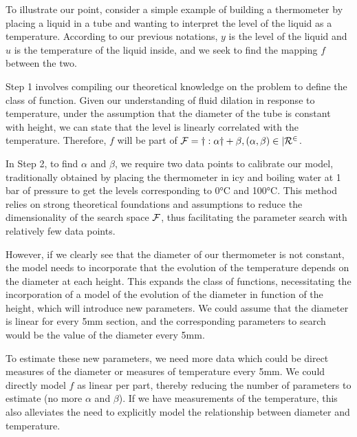 \begin{bibunit}
To illustrate our point, consider a simple example of building a thermometer by placing a liquid in a tube and wanting to interpret the level of the liquid as a temperature. According to our previous notations, $y$ is the level of the liquid and $u$ is the temperature of the liquid inside, and we seek to find the mapping $f$ between the two.

Step 1 involves compiling our theoretical knowledge on the problem to define the class of function. Given our understanding of fluid dilation in response to temperature, under the assumption that the diameter of the tube is constant with height, we can state that the level is linearly correlated with the temperature. Therefore, $f$ will be part of $\cal{F} = { y: \alpha y + \beta , (\alpha, \beta) \in |R^2 }$.

In Step 2, to find $\alpha$ and $\beta$, we require two data points to calibrate our model, traditionally obtained by placing the thermometer in icy and boiling water at 1 bar of pressure to get the levels corresponding to 0°C and 100°C. This method relies on strong theoretical foundations and assumptions to reduce the dimensionality of the search space $\cal{F}$, thus facilitating the parameter search with relatively few data points.

However, if we clearly see that the diameter of our thermometer is not constant, the model needs to incorporate that the evolution of the temperature depends on the diameter at each height. This expands the class of functions, necessitating the incorporation of a model of the evolution of the diameter in function of the height, which will introduce new parameters. We could assume that the diameter is linear for every 5mm section, and the corresponding parameters to search would be the value of the diameter every 5mm.

To estimate these new parameters, we need more data which could be direct measures of the diameter or measures of temperature every 5mm. We could directly model $f$ as linear per part, thereby reducing the number of parameters to estimate (no more $\alpha$ and $\beta$). If we have measurements of the temperature, this also alleviates the need to explicitly model the relationship between diameter and temperature.




  



\end{bibunit}
